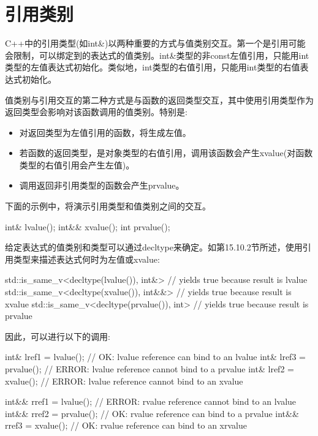 \section{引用类别}
C++中的引用类型(如int\&)以两种重要的方式与值类别交互。第一个是引用可能会限制，可以绑定到的表达式的值类别。int\&类型的非const左值引用，只能用int类型的左值表达式初始化。类似地，int类型的右值引用，只能用int类型的右值表达式初始化。

值类别与引用交互的第二种方式是与函数的返回类型交互，其中使用引用类型作为返回类型会影响对该函数调用的值类别。特别是:

\begin{itemize}
\item 
对返回类型为左值引用的函数，将生成左值。

\item 
若函数的返回类型，是对象类型的右值引用，调用该函数会产生xvalue(对函数类型的右值引用会产生左值)。

\item 
调用返回非引用类型的函数会产生prvalue。
\end{itemize}

下面的示例中，将演示引用类型和值类别之间的交互。

\begin{cpp}
int& lvalue();
int&& xvalue();
int prvalue();
\end{cpp}

给定表达式的值类别和类型可以通过decltype来确定。如第15.10.2节所述，使用引用类型来描述表达式何时为左值或xvalue:

\begin{cpp}
std::is_same_v<decltype(lvalue()), int&> // yields true because result is lvalue
std::is_same_v<decltype(xvalue()), int&&> // yields true because result is xvalue
std::is_same_v<decltype(prvalue()), int> // yields true because result is prvalue
\end{cpp}

因此，可以进行以下的调用:

\begin{cpp}
int& lref1 = lvalue(); // OK: lvalue reference can bind to an lvalue
int& lref3 = prvalue(); // ERROR: lvalue reference cannot bind to a prvalue
int& lref2 = xvalue(); // ERROR: lvalue reference cannot bind to an xvalue

int&& rref1 = lvalue(); // ERROR: rvalue reference cannot bind to an lvalue
int&& rref2 = prvalue(); // OK: rvalue reference can bind to a prvalue
int&& rref3 = xvalue(); // OK: rvalue reference can bind to an xrvalue
\end{cpp}
















